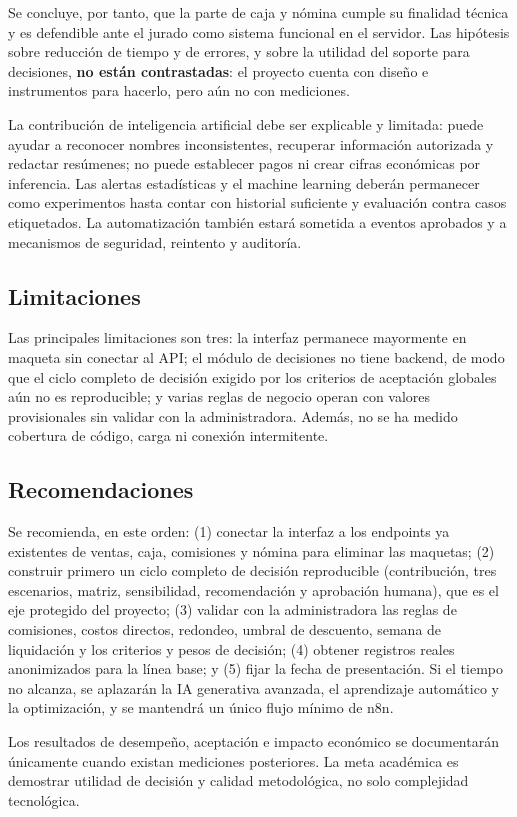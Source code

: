 Se concluye, por tanto, que la parte de caja y nómina cumple su finalidad técnica y es defendible ante el jurado como sistema funcional en el servidor. Las hipótesis sobre reducción de tiempo y de errores, y sobre la utilidad del soporte para decisiones, \textbf{no están contrastadas}: el proyecto cuenta con diseño e instrumentos para hacerlo, pero aún no con mediciones.

La contribución de inteligencia artificial debe ser explicable y limitada: puede ayudar a reconocer nombres inconsistentes, recuperar información autorizada y redactar resúmenes; no puede establecer pagos ni crear cifras económicas por inferencia. Las alertas estadísticas y el machine learning deberán permanecer como experimentos hasta contar con historial suficiente y evaluación contra casos etiquetados. La automatización también estará sometida a eventos aprobados y a mecanismos de seguridad, reintento y auditoría.

\subsection{Limitaciones}

Las principales limitaciones son tres: la interfaz permanece mayormente en maqueta sin conectar al API; el módulo de decisiones no tiene backend, de modo que el ciclo completo de decisión exigido por los criterios de aceptación globales aún no es reproducible; y varias reglas de negocio operan con valores provisionales sin validar con la administradora. Además, no se ha medido cobertura de código, carga ni conexión intermitente.

\subsection{Recomendaciones}

Se recomienda, en este orden: (1) conectar la interfaz a los endpoints ya existentes de ventas, caja, comisiones y nómina para eliminar las maquetas; (2) construir primero un ciclo completo de decisión reproducible (contribución, tres escenarios, matriz, sensibilidad, recomendación y aprobación humana), que es el eje protegido del proyecto; (3) validar con la administradora las reglas de comisiones, costos directos, redondeo, umbral de descuento, semana de liquidación y los criterios y pesos de decisión; (4) obtener registros reales anonimizados para la línea base; y (5) fijar la fecha de presentación. Si el tiempo no alcanza, se aplazarán la IA generativa avanzada, el aprendizaje automático y la optimización, y se mantendrá un único flujo mínimo de n8n.

Los resultados de desempeño, aceptación e impacto económico se documentarán únicamente cuando existan mediciones posteriores. La meta académica es demostrar utilidad de decisión y calidad metodológica, no solo complejidad tecnológica.
